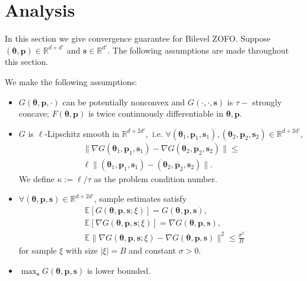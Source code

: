 \section{Analysis}\label{sec:theory}

In this section we give convergence guarantee for Bilevel ZOFO. Suppose $({ \mathbf{{ \bm{\theta}}}},{ \mathbf{p}})\in\mathbb{R}^{d+d'}$ and ${ \mathbf{s}}\in\mathbb{R}^{d'}$. The following assumptions are made throughout this section.

\begin{assumption}
\label{assumption1} We make the following assumptions:
    \begin{itemize}
        \item $G({ \mathbf{{ \bm{\theta}}}},{ \mathbf{{ \mathbf{p}}}},\cdot)$ can be potentially nonconvex and $G(\cdot,\cdot,{ \mathbf{s}}) $ is $\tau-$ strongly concave; $F({ \mathbf{{ \bm{\theta}}}},{ \mathbf{p}})$ is twice continuously differentiable in ${ \mathbf{{ \bm{\theta}}}}, { \mathbf{p}}$.
        \item $G$ is $\ell$-Lipschitz smooth in $\mathbb{R}^{d+2d'},$ i.e. $\forall ({ \mathbf{{ \bm{\theta}}}}_1,{ \mathbf{p}}_1,{ \mathbf{s}}_1),({ \mathbf{{ \bm{\theta}}}}_2,{ \mathbf{p}}_2,{ \mathbf{s}}_2)\in\mathbb{R}^{d+2d'}$, 
        \begin{multline*}
            \|\nabla G({ \mathbf{{ \bm{\theta}}}}_1,{ \mathbf{p}}_1,{ \mathbf{s}}_1)-\nabla G({ \mathbf{{ \bm{\theta}}}}_2,{ \mathbf{p}}_2,{ \mathbf{s}}_2)\|\leq \\ \ell\|({ \mathbf{{ \bm{\theta}}}}_1,{ \mathbf{p}}_1,{ \mathbf{s}}_1)-({ \mathbf{{ \bm{\theta}}}}_2,{ \mathbf{p}}_2,{ \mathbf{s}}_2)\|.
        \end{multline*}
        We define $\kappa:=\ell/\tau$ as the problem condition number.
        \item $\forall ({ \mathbf{{ \bm{\theta}}}},{ \mathbf{p}},{ \mathbf{s}})\in \mathbb{R}^{d+2d'}$, sample estimates satisfy 
        \begin{equation*}
        \begin{split}
            &\mathbb{E}[G({ \mathbf{{ \bm{\theta}}}},{ \mathbf{p}},{ \mathbf{s}};\xi)]=G({ \mathbf{{ \bm{\theta}}}},{ \mathbf{p}},{ \mathbf{s}}),\\
            &\mathbb{E}[\nabla G({ \mathbf{{ \bm{\theta}}}},{ \mathbf{p}},{ \mathbf{s}};\xi)]=\nabla G({ \mathbf{{ \bm{\theta}}}},{ \mathbf{p}},{ \mathbf{s}}),\\
            &\mathbb{E}\|\nabla G({ \mathbf{{ \bm{\theta}}}},{ \mathbf{p}},{ \mathbf{s}};\xi)-\nabla G({ \mathbf{{ \bm{\theta}}}},{ \mathbf{p}},{ \mathbf{s}})\|^2\leq \frac{\sigma^2}{B}
        \end{split}
        \end{equation*}
        for sample $\xi$ with size $|\xi|=B$ and constant $\sigma>0$.
        \item $\max_{ \mathbf{s}} G({ \mathbf{{ \bm{\theta}}}},{ \mathbf{p}},{ \mathbf{s}})$ is lower bounded.
    \end{itemize}
\end{assumption}

